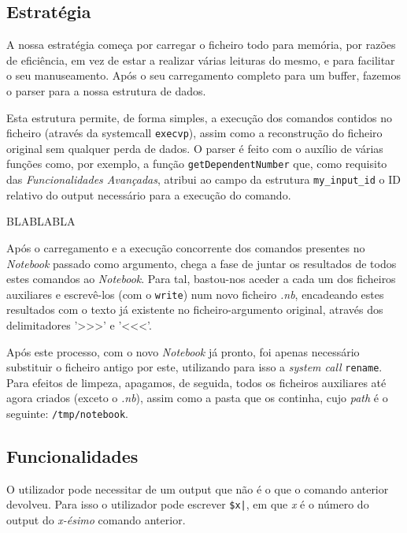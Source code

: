 \documentclass[a4paper]{article}
\begin{document}
\subsection{Estratégia}

A nossa estratégia começa por carregar o ficheiro todo para memória, por razões de eficiência, em vez de estar a realizar várias 
leituras do mesmo, e para facilitar o seu manuseamento. Após o seu carregamento completo para um buffer, fazemos o parser para a nossa 
estrutura de dados. 


Esta estrutura permite, de forma simples, a execução dos comandos contidos no ficheiro (através da systemcall \texttt{execvp}),
assim como a reconstrução do ficheiro original sem qualquer perda de dados. O parser é feito com o auxílio de várias funções como, por 
exemplo, a função \texttt {getDependentNumber} que, como requisito das \textit{Funcionalidades Avançadas}, atribui ao campo da 
estrutura \texttt{my\_input\_id} o ID relativo do output necessário para a execução do comando.

BLABLABLA

Após o carregamento e a execução concorrente dos comandos presentes no \textit{Notebook} passado como argumento, chega a fase de juntar os resultados 
de todos estes comandos ao \textit{Notebook}. Para tal, bastou-nos aceder a cada um dos ficheiros auxiliares e escrevê-los (com o \texttt{write}) num 
novo ficheiro \textit{.nb}, encadeando estes resultados com o texto já existente no ficheiro-argumento original, através dos delimitadores '>>>' e '<<<'. 

Após este processo, com o novo \textit{Notebook} já pronto, foi apenas necessário substituir o ficheiro antigo por este, utilizando para isso a \textit{system call} 
\texttt{rename}. Para efeitos de limpeza, apagamos, de seguida, todos os ficheiros auxiliares até agora criados (exceto o \textit{.nb}), assim como a pasta que os 
continha, cujo \textit{path} é o seguinte: \texttt{/tmp/notebook}.


\subsection{Funcionalidades}
\label{sec:funcionalidades}

O utilizador pode necessitar de um output que não é o que o comando anterior devolveu. Para isso o utilizador pode escrever 
\texttt{\$x|}, em que \textit{x} é o número do output do \textit{x-ésimo} comando anterior. 
\end{document}
